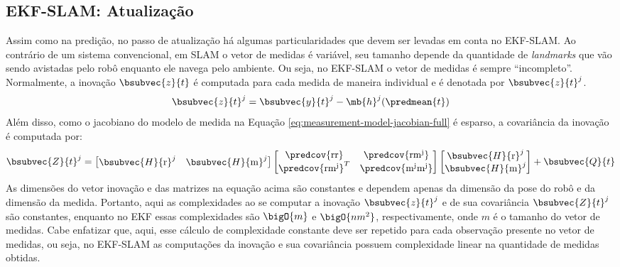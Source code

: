 \subsection{EKF-SLAM: Atualização}
\label{sec:ekf-slam-update}
Assim como na predição, no passo de atualização há algumas particularidades 
que devem ser levadas em conta no EKF-SLAM. Ao contrário de um sistema convencional, em SLAM o vetor de medidas é variável, seu tamanho depende da 
quantidade de \textit{landmarks} que vão sendo avistadas pelo robô enquanto 
ele navega pelo ambiente. Ou seja, no EKF-SLAM o vetor de medidas é sempre 
``incompleto''. Normalmente, a inovação $\bsubvec{z}{t}$ é computada para cada 
medida de maneira individual e é denotada por $\bsubvec{z}{t}^j$.
\begin{equation}
  \bsubvec{z}{t}^j = \bsubvec{y}{t}^j - \mb{h}^j(\predmean{t})
  \label{eq:ekf-slam-innovation}
\end{equation}
Além disso, como o jacobiano do modelo de medida na Equação \ref{eq:measurement-model-jacobian-full} é esparso, a covariância da inovação é computada por:
\renewcommand{\arraystretch}{1.5}
\begin{equation}
  \bsubvec{Z}{t}^j = \begin{bmatrix}
    \bsubvec{H}{\mathrm{r}}^j & \bsubvec{H}{\mathrm{m}}^j
  \end{bmatrix}
  \begin{bmatrix}
    \predcov{\mathrm{rr}} & \predcov{\mathrm{rm^j}} \\
    \predcov{\mathrm{rm^j}}^T & \predcov{\mathrm{m^j m^j}}
  \end{bmatrix}
  \begin{bmatrix}
    \bsubvec{H}{\mathrm{r}}^j \\ \bsubvec{H}{\mathrm{m}}^j
  \end{bmatrix} + \bsubvec{Q}{t}
  \label{eq:ekf-slam-innovation-covariance}
\end{equation}
\renewcommand{\arraystretch}{1.0}
As dimensões do vetor inovação e das matrizes na equação acima são constantes e dependem apenas da dimensão da pose do robô e da dimensão da medida. 
Portanto, aqui as complexidades ao se computar a inovação $\bsubvec{z}{t}^j$ e de sua covariância $\bsubvec{Z}{t}^j$ são constantes, enquanto no EKF essas complexidades são $\bigO{m}$ e $\bigO{nm^2}$, respectivamente, onde $m$ é o tamanho do vetor de medidas. Cabe enfatizar que, aqui, esse cálculo de complexidade constante deve ser repetido para cada observação presente no vetor de medidas, ou seja, no EKF-SLAM as computações da
inovação e sua covariância possuem complexidade linear na quantidade de medidas obtidas.

